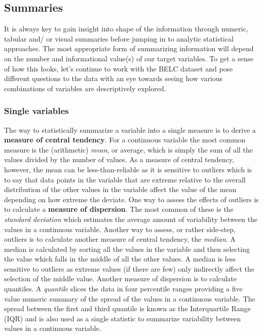 \documentclass[
  letterpaper,
]{latex/krantz}
\begin{document}
\hypertarget{summaries}{%
\subsection{Summaries}\label{summaries}}

It is always key to gain insight into shape of the information through
numeric, tabular and/ or visual summaries before jumping in to analytic
statistical approaches. The most appropriate form of summarizing
information will depend on the number and informational value(s) of our
target variables. To get a sense of how this looks, let's continue to
work with the BELC dataset and pose different questions to the data with
an eye towards seeing how various combinations of variables are
descriptively explored.

\hypertarget{single-variables}{%
\subsubsection{Single variables}\label{single-variables}}

The way to statistically summarize a variable into a single measure is
to derive a \textbf{measure of central tendency}. For a continuous
variable the most common measure is the (arithmetic) \emph{mean}, or
average, which is simply the sum of all the values divided by the number
of values. As a measure of central tendency, however, the mean can be
less-than-reliable as it is sensitive to outliers which is to say that
data points in the variable that are extreme relative to the overall
distribution of the other values in the variable affect the value of the
mean depending on how extreme the deviate. One way to assess the effects
of outliers is to calculate a \textbf{measure of dispersion}. The most
common of these is the \emph{standard deviation} which estimates the
average amount of variability between the values in a continuous
variable. Another way to assess, or rather side-step, outliers is to
calculate another measure of central tendency, the \emph{median}. A
median is calculated by sorting all the values in the variable and then
selecting the value which falls in the middle of all the other values. A
median is less sensitive to outliers as extreme values (if there are
few) only indirectly affect the selection of the middle value. Another
measure of dispersion is to calculate quantiles. A \emph{quantile}
slices the data in four percentile ranges providing a five value numeric
summary of the spread of the values in a continuous variable. The spread
between the first and third quantile is known as the Interquartile Range
(IQR) and is also used as a single statistic to summarize variability
between values in a continuous variable.
\end{document}
